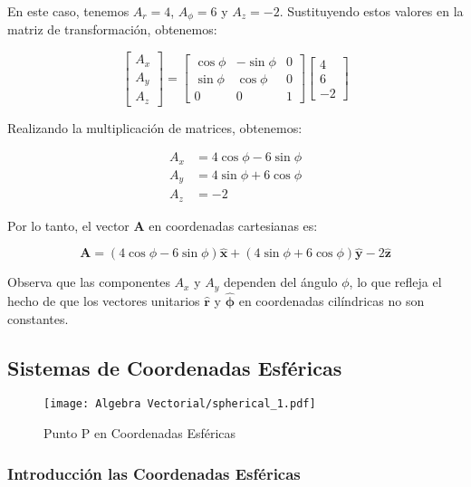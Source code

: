 \documentclass{book}
\begin{document}
En este caso, tenemos $A_r = 4$, $A_{\phi} = 6$ y $A_z = -2$. Sustituyendo estos valores en la matriz de transformación, obtenemos:

\begin{equation*}
\begin{bmatrix} A_x \\ A_y \\ A_z \end{bmatrix} = 
\begin{bmatrix} \cos \phi & -\sin \phi & 0 \\ \sin \phi & \cos \phi & 0 \\ 0 & 0 & 1 \end{bmatrix}
\begin{bmatrix} 4 \\ 6 \\ -2 \end{bmatrix}
\end{equation*}

Realizando la multiplicación de matrices, obtenemos:

\begin{align*}
A_x &= 4 \cos \phi - 6 \sin \phi \\
A_y &= 4 \sin \phi + 6 \cos \phi \\
A_z &= -2
\end{align*}

Por lo tanto, el vector $\mathbf{A}$ en coordenadas cartesianas es:

\begin{equation*}
\mathbf{A} = (4 \cos \phi - 6 \sin \phi) \mathbf{\hat{x}} + (4 \sin \phi + 6 \cos \phi) \mathbf{\hat{y}} - 2 \mathbf{\hat{z}}
\end{equation*}

Observa que las componentes $A_x$ y $A_y$ dependen del ángulo $\phi$, lo que refleja el hecho de que los vectores unitarios $\mathbf{\hat{r}}$ y $\mathbf{\hat{\phi}}$ en coordenadas cilíndricas no son constantes.
\subsection{Sistemas de Coordenadas Esféricas}

\begin{figure}[!h]
    \centering
    \texttt{[image: Algebra Vectorial/spherical\_1.pdf]}
    \caption{Punto P en Coordenadas Esféricas}
    \label{fig:coordenadas_esfericas}
\end{figure}
\subsubsection*{Introducción las Coordenadas Esféricas}
\end{document}

